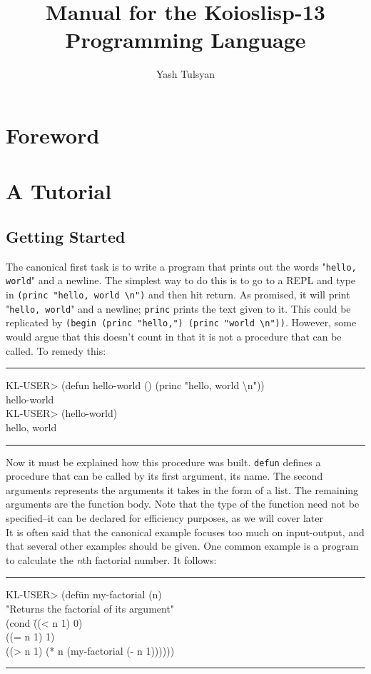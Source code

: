 \documentclass[10pt]{book}
\author{Yash Tulsyan}
\title{Manual for the Koioslisp-13 Programming Language}
\newenvironment{lisp}{\hrule\begin{ttfamily}\begin{tabbing}}{\par\end{tabbing}\end{ttfamily}\hrule}
\begin{document}
\maketitle
\tableofcontents
\chapter{Foreword}
\chapter{A Tutorial}
\section{Getting Started}
The canonical first task is to write a program that prints out the words "\texttt{hello, world}" and a newline. The simplest way to do this is to go to a REPL and type in \texttt{(princ "hello, world \textbackslash n")} and then hit return. As promised, it will print "\texttt{hello, world}" and a newline; \texttt{princ} prints the text given to it. This could be replicated by \texttt{(begin (princ "hello,") (princ "world \textbackslash n"))}. However, some would argue that this doesn't count in that it is not a procedure that can be called. To remedy this:\\
\begin{lisp}
KL-USER> (defun hello-world () (princ "hello, world \textbackslash n"))\\
hello-world\\
KL-USER> (hello-world)\\
hello, world\\
\space
\end{lisp}
Now it must be explained how this procedure was built. \texttt{defun} defines a procedure that can be called by its first argument, its name. The second arguments represents the arguments it takes in the form of a list. The remaining arguments are the function body. Note that the type of the function need not be specified--it can be declared for efficiency purposes, as we will cover later\\
It is often said that the canonical example focuses too much on input-output, and that several other examples should be given. One common example is a program to calculate the \textit{n}th factorial number. It follows:\\
\begin{lisp}
KL-USER> (def\=un my-factorial (n)\\
\> "Returns the factorial of its argument"\\
\>(cond \=((< n 1) 0)\\
\>\>((= n 1) 1)\\
\>\>((> n 1) (* n (my-factorial (- n 1))))))
\end{lisp}
\end{document}
